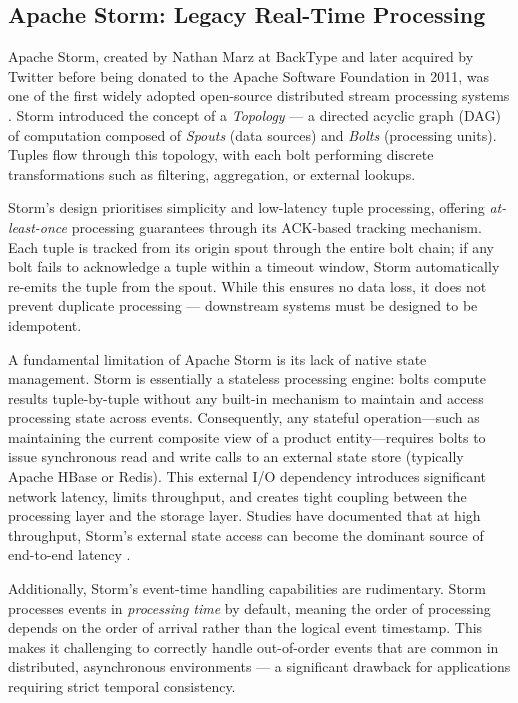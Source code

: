\subsection{Apache Storm: Legacy Real-Time Processing}
\begin{justify}
    Apache Storm, created by Nathan Marz at BackType and later acquired by Twitter before being donated to the Apache Software Foundation in 2011, was one of the first widely adopted open-source distributed stream processing systems \cite{[7]}. Storm introduced the concept of a \textit{Topology} — a directed acyclic graph (DAG) of computation composed of \textit{Spouts} (data sources) and \textit{Bolts} (processing units). Tuples flow through this topology, with each bolt performing discrete transformations such as filtering, aggregation, or external lookups.

    Storm's design prioritises simplicity and low-latency tuple processing, offering \textit{at-least-once} processing guarantees through its ACK-based tracking mechanism. Each tuple is tracked from its origin spout through the entire bolt chain; if any bolt fails to acknowledge a tuple within a timeout window, Storm automatically re-emits the tuple from the spout. While this ensures no data loss, it does not prevent duplicate processing — downstream systems must be designed to be idempotent.

    A fundamental limitation of Apache Storm is its lack of native state management. Storm is essentially a stateless processing engine: bolts compute results tuple-by-tuple without any built-in mechanism to maintain and access processing state across events. Consequently, any stateful operation—such as maintaining the current composite view of a product entity—requires bolts to issue synchronous read and write calls to an external state store (typically Apache HBase or Redis). This external I/O dependency introduces significant network latency, limits throughput, and creates tight coupling between the processing layer and the storage layer. Studies have documented that at high throughput, Storm's external state access can become the dominant source of end-to-end latency \cite{[8]}.

    Additionally, Storm's event-time handling capabilities are rudimentary. Storm processes events in \textit{processing time} by default, meaning the order of processing depends on the order of arrival rather than the logical event timestamp. This makes it challenging to correctly handle out-of-order events that are common in distributed, asynchronous environments — a significant drawback for applications requiring strict temporal consistency.
\end{justify}

